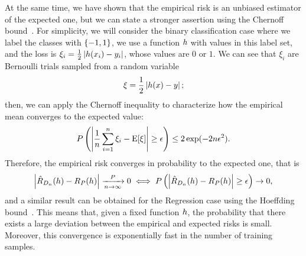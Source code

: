 At the same time, we have shown that the empirical risk is an unbiased estimator of the expected one, but we can state a stronger assertion using the Chernoff bound~\citep{Chernoff52}.
For simplicity, we will consider the binary classification case where we label the classes with $\left\{-1, 1\right\}$, we use a function $h$ with values in this label set, and the loss is $\xi_i = \frac{1}{2} \left|h(x_i) - y_i\right|$, whose values are $0$ or $1$. We can see that $\xi_i$ are Bernoulli trials sampled from a random variable 
$$ \xi = \frac{1}{2} \left|h(x) - y\right| ;$$
then, we can apply the Chernoff inequality to characterize how the empirical mean converges to the expected value:
\begin{equation}
    \nonumber
    P \left(\left|\frac{1}{n} \sum_{i=1}^n \xi_i - \operatorname{E}[\xi]\right| \geq \epsilon  \right) \leq 2 \exp(-2n \epsilon^2) .
\end{equation}
Therefore, the empirical risk converges in probability to the expected one, that is
\begin{equation}
    \label{eq:risk_chernoff}
    \abs{\empriskn(\hypf) -\exprisk(\hypf)} \xrightarrow[\nsamples \to \infty]{\distf} 0 \iff P\left(\abs{\empriskn(\hypf) -\exprisk(\hypf)} \geq \epsilon  \right) \to 0,
\end{equation}
and a similar result can be obtained for the Regression case using the Hoeffding bound~\citep{Hoeffding63}.
This means that, given a fixed function $h$, the probability that there exists a large deviation between the empirical and expected risks is small. Moreover, this convergence is exponentially fast in the number of training samples.

